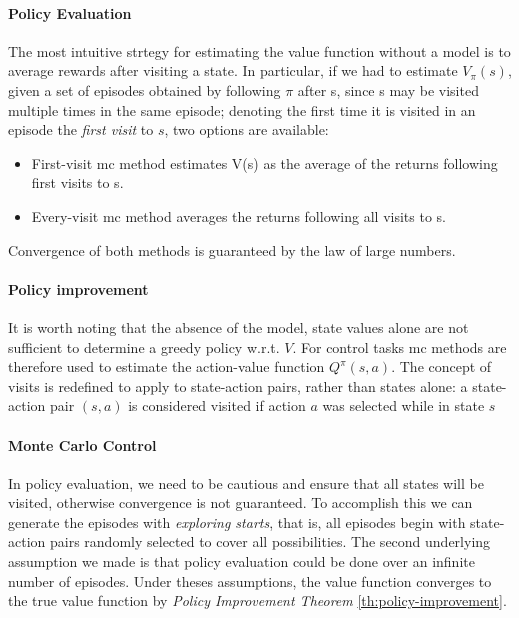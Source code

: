 \paragraph{Policy Evaluation} The most intuitive strtegy for estimating the value function without a model 
is to average rewards after visiting a state.
In particular, if we had to estimate $V_{\pi}(s)$, given a set of episodes obtained by following ${\pi}$
after s, since s may be visited multiple times in the same episode; denoting the first time it is 
visited in an episode the \textit{first visit} to $s$, two options are available:
\begin{itemize}
    \item First-visit \gls{mc} method estimates V(s) as the average of the returns following first visits to s.
    \item Every-visit \gls{mc} method averages the returns following all visits to s.
\end{itemize}

Convergence of both methods is guaranteed by the law of large numbers.

\paragraph{Policy improvement}
It is worth noting that the absence of the model, state values alone are not sufficient to determine a 
greedy policy w.r.t. $V$. For control tasks \gls{mc} methods are therefore used to estimate the action-value function
$Q^{\pi} (s, a)$. 
The concept of visits is redefined to apply to state-action pairs, rather than states alone: a 
state-action pair $(s, a)$ is considered visited if action $a$ was selected while in state $s$

\paragraph{Monte Carlo Control}
In policy evaluation, we need to be cautious and ensure that all
states will be visited, otherwise convergence is not guaranteed. To accomplish this we can generate the 
episodes with \textit{exploring starts}, that is, all episodes begin with state-action pairs randomly
selected to cover all possibilities.
The second underlying assumption we made is that policy evaluation could be done over an infinite number of 
episodes. Under theses assumptions, the value function converges to the true value function by 
\textit{Policy Improvement Theorem} \ref{th:policy-improvement}. 

